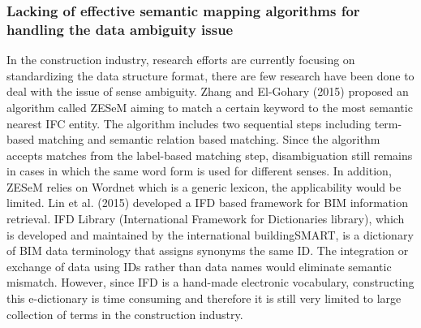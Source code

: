 \documentclass[Journal, InsideFigs, DoubleSpace]{ascelike} %
\begin{document}
\subsubsection{Lacking of effective semantic mapping algorithms for handling the data ambiguity issue}
In the construction industry, research efforts are currently focusing on standardizing the data structure format, there are few research have been done to deal with the issue of sense ambiguity. Zhang and El-Gohary (2015) \cite{Zhang15c} proposed an algorithm called ZESeM aiming to match a certain keyword to the most semantic nearest IFC entity. The algorithm includes two sequential steps including term-based matching and semantic relation based matching. Since the algorithm accepts matches from the label-based matching step, disambiguation still remains in cases in which the same word form is used for different senses. In addition, ZESeM relies on Wordnet which is a generic lexicon, the applicability would be limited. Lin et al. (2015) \cite{Lin15} developed a IFD based framework for BIM information retrieval. IFD Library (International Framework for Dictionaries library), which is developed and maintained by the international buildingSMART, is a dictionary of BIM data terminology that assigns synonyms the same ID. The integration or exchange of data using IDs rather than data names would eliminate semantic mismatch. However, since IFD is a hand-made electronic vocabulary, constructing this e-dictionary is time consuming and therefore it is still very limited to large collection of terms in the construction industry.
%
\end{document}
